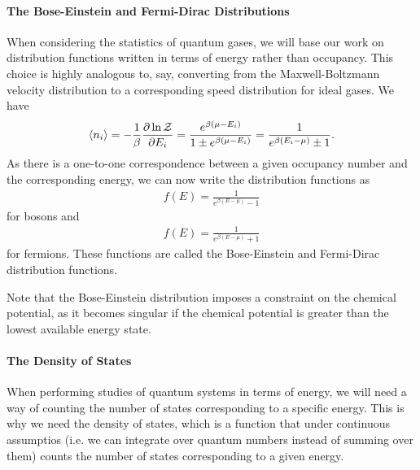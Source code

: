 \paragraph{The Bose-Einstein and Fermi-Dirac Distributions}
When considering the statistics of quantum gases, we will base our work on distribution functions written in terms of energy rather than occupancy. This choice is highly analogous to, say, converting from the Maxwell-Boltzmann velocity distribution to a corresponding speed distribution for ideal gases. We have
\begin{align*}
\expval{n_{i}} = -\frac{1}{\beta}\pdv{\ln{\mathcal{Z}}}{E_{i}} = \frac{e^{\beta(\mu - E_{i})}}{1 \pm e^{\beta(\mu - E_{i})}} = \frac{1}{e^{\beta(E_{i} - \mu)} \pm 1}.
\end{align*}
As there is a one-to-one correspondence between a given occupancy number and the corresponding energy, we can now write the distribution functions as
\begin{align*}
f(E) = \frac{1}{e^{\beta(E - \mu)} - 1}
\end{align*}
for bosons and
\begin{align*}
f(E) = \frac{1}{e^{\beta(E - \mu)} + 1}
\end{align*}
for fermions. These functions are called the Bose-Einstein and Fermi-Dirac distribution functions.

Note that the Bose-Einstein distribution imposes a constraint on the chemical potential, as it becomes singular if the chemical potential is greater than the lowest available energy state.

\paragraph{The Density of States}
When performing studies of quantum systems in terms of energy, we will need a way of counting the number of states corresponding to a specific energy. This is why we need the density of states, which is a function that under continuous assumptios (i.e. we can integrate over quantum numbers instead of summing over them) counts the number of states corresponding to a given energy.

